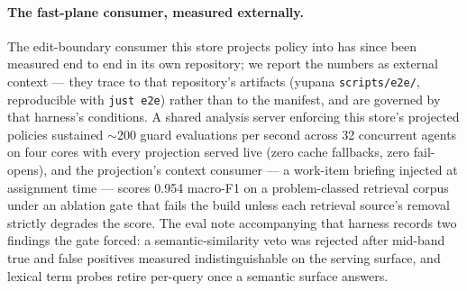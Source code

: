 \paragraph{The fast-plane consumer, measured externally.}
The edit-boundary consumer this store projects policy into has since
been measured end to end in its own repository; we report the numbers
as external context --- they trace to that repository's artifacts
(yupana \texttt{scripts/e2e/}, reproducible with \texttt{just e2e})
rather than to the \census manifest, and are governed by that
harness's conditions. A shared analysis server enforcing this store's
projected policies sustained $\sim$200 guard evaluations per second
across 32 concurrent agents on four cores with every projection served
live (zero cache fallbacks, zero fail-opens), and the projection's
context consumer --- a work-item briefing injected at assignment time
--- scores 0.954 macro-F1 on a problem-classed retrieval corpus under
an ablation gate that fails the build unless each retrieval source's
removal strictly degrades the score. The eval note accompanying that
harness records two findings the gate forced: a semantic-similarity
veto was rejected after mid-band true and false positives measured
indistinguishable on the serving surface, and lexical term probes
retire per-query once a semantic surface answers.
